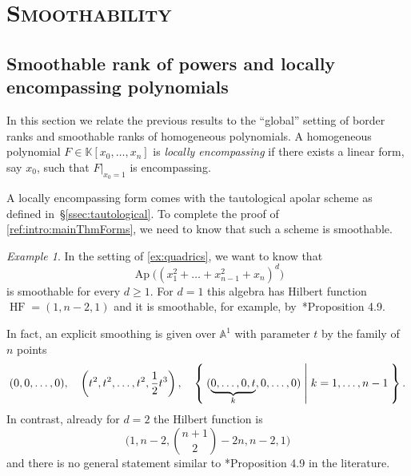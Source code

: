 \documentclass[a4paper,11pt,reqno]{amsart}
\newcommand{\bbK}{\mathbb{K}}
\DeclareMathOperator{\Ap}{Ap}
\DeclareMathOperator{\HF}{HF}
\numberwithin{equation}{section}
\theoremstyle{definition}
\theoremstyle{plain}
\theoremstyle{remark}
\newtheorem{exam}[defn]{Example}
\begin{document}
\section{\normalfont \scshape{}\selectfont Smoothability}
\subsection{Smoothable rank of powers and locally encompassing polynomials} \label{sec:smoothableRank}
\noindent In this section we relate the previous results to the ``global'' setting of
border ranks and smoothable ranks of homogeneous polynomials. A
homogeneous polynomial $F\in \bbK[x_0, \ldots ,x_n]$ is \emph{locally encompassing}
if there exists a linear form, {say $x_0$,} such that $F|_{x_0 = 1}$ is
encompassing.

A locally encompassing form comes with the tautological apolar scheme {as defined} in~\S\ref{ssec:tautological}. To complete the proof of
\autoref{ref:intro:mainThmForms}, we need to know that such a scheme is
smoothable.

\begin{exam}
    In the setting of \autoref{ex:quadrics}, we want to know that
    \[
        \Ap\bigl( (x_1^2 +  \ldots + x_{n-1}^2 + x_n)^d \bigr)
    \]
    is smoothable for every $d\geq 1$. For $d = 1$ this algebra has Hilbert
    function $\HF = (1, n-2, 1)$ and {it is smoothable, for example,
    by~\cite{CEVV09}*{Proposition 4.9}.}

    In fact, an explicit smoothing is given over $\mathbb{A}^1$ with parameter $t$ by the
    family of $n$ points
    \[
        (0,0, \ldots ,0),
        \quad \left(t^2, t^2, \ldots, t^2, \frac{1}{2} t^3\right),
        \quad \Set{(\underbrace{0,  \ldots , 0, t}_k, 0, \dots ,0) | k=1,
        \ldots ,n-1}.
    \]
    In contrast, already for $d = 2$ the
    Hilbert function is \[\Biggl(1, n-2, \binom{n+1}{2} - 2n, n-2, 1\Biggr)\] and there is no general
    statement similar to \cite{CEVV09}*{Proposition 4.9} in the
    literature.
\end{exam}
\end{document}
